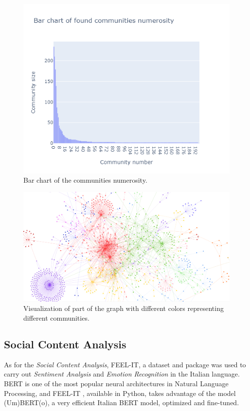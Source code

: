 \documentclass[12pt,journal,compsoc]{IEEEtran}
\begin{document}
\begin{figure}[H]
	\includegraphics[scale=.5]{./images/newplot.png}
	\caption{Bar chart of the communities numerosity.}
\end{figure}

\begin{figure}[H]
	\includegraphics[scale=.20]{./images/graph_visualization.png}
	\caption{Visualization of part of the graph with different colors representing different communities.}
\end{figure}

\subsection{Social Content Analysis}
As for the \textit{Social Content Analysis}, FEEL-IT, a dataset and package was used to carry out \textit{Sentiment Analysis} and \textit{Emotion Recognition} in the Italian language.\\
BERT is one of the most popular neural architectures in Natural Language Processing, and FEEL-IT \cite{FEEL-IT}, available in Python, takes advantage of the model (Um)BERT(o), a very efficient Italian BERT model, optimized and fine-tuned.
\end{document}
